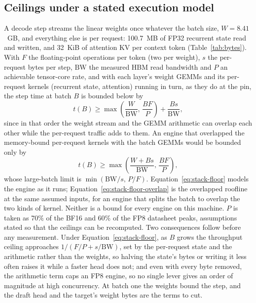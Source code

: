 \subsection{Ceilings under a stated execution model}\label{sec:stack-ceilings}
A decode step streams the linear weights once whatever the batch size, $W=8.41$~GB, and everything else is per request: 100.7~MB of FP32 recurrent state read and written, and 32~KiB of attention KV per context token (Table~\ref{tab:bytes}). With $F$ the floating-point operations per token (two per weight), $s$ the per-request bytes per step, $\mathrm{BW}$ the measured HBM read bandwidth and $P$ an achievable tensor-core rate, and with each layer's weight GEMMs and its per-request kernels (recurrent state, attention) running in turn, as they do at the pin, the step time at batch $B$ is bounded below by
\begin{equation}
t(B)\ge\max\!\left(\frac{W}{\mathrm{BW}},\,\frac{BF}{P}\right)+\frac{Bs}{\mathrm{BW}},\label{eq:stack-floor}
\end{equation}
since in that order the weight stream and the GEMM arithmetic can overlap each other while the per-request traffic adds to them. An engine that overlapped the memory-bound per-request kernels with the batch GEMMs would be bounded only by
\begin{equation}
t(B)\ge\max\!\left(\frac{W+Bs}{\mathrm{BW}},\,\frac{BF}{P}\right),\label{eq:stack-floor-overlap}
\end{equation}
whose large-batch limit is $\min(\mathrm{BW}/s,\,P/F)$. Equation~\eqref{eq:stack-floor} models the engine as it runs; Equation~\eqref{eq:stack-floor-overlap} is the overlapped roofline at the same assumed inputs, for an engine that splits the batch to overlap the two kinds of kernel. Neither is a bound for every engine on this machine. $P$ is taken as 70\% of the BF16 and 60\% of the FP8 datasheet peaks, assumptions stated so that the ceilings can be recomputed. Two consequences follow before any measurement. Under Equation~\eqref{eq:stack-floor}, as $B$ grows the throughput ceiling approaches $1/(F/P+s/\mathrm{BW})$, set by the per-request state and the arithmetic rather than the weights, so halving the state's bytes or writing it less often raises it while a faster head does not; and even with every byte removed, the arithmetic term caps an FP8 engine, so no single lever gives an order of magnitude at high concurrency. At batch one the weights bound the step, and the draft head and the target's weight bytes are the terms to cut.

